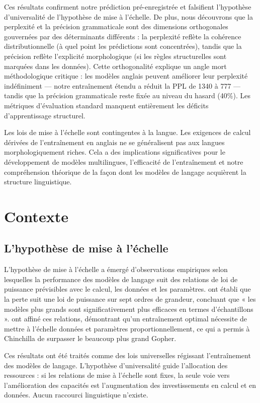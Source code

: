 \documentclass[11pt,a4paper]{article}
\begin{document}
Ces résultats confirment notre prédiction pré-enregistrée et falsifient l'hypothèse d'universalité de l'hypothèse de mise à l'échelle. De plus, nous découvrons que la perplexité et la précision grammaticale sont des dimensions orthogonales gouvernées par des déterminants différents : la perplexité reflète la cohérence distributionnelle (à quel point les prédictions sont concentrées), tandis que la précision reflète l'explicité morphologique (si les règles structurelles sont marquées dans les données). Cette orthogonalité explique un angle mort méthodologique critique : les modèles anglais peuvent améliorer leur perplexité indéfiniment --- notre entraînement étendu a réduit la PPL de 1340 à 777 --- tandis que la précision grammaticale reste fixée au niveau du hasard (40\%). Les métriques d'évaluation standard manquent entièrement les déficits d'apprentissage structurel.

Les lois de mise à l'échelle sont contingentes à la langue. Les exigences de calcul dérivées de l'entraînement en anglais ne se généralisent pas aux langues morphologiquement riches. Cela a des implications significatives pour le développement de modèles multilingues, l'efficacité de l'entraînement et notre compréhension théorique de la façon dont les modèles de langage acquièrent la structure linguistique.

\section{Contexte}

\subsection{L'hypothèse de mise à l'échelle}

L'hypothèse de mise à l'échelle a émergé d'observations empiriques selon lesquelles la performance des modèles de langage suit des relations de loi de puissance prévisibles avec le calcul, les données et les paramètres. \citet{kaplan2020scaling} ont établi que la perte suit une loi de puissance sur sept ordres de grandeur, concluant que « les modèles plus grands sont significativement plus efficaces en termes d'échantillons ». \citet{hoffmann2022training} ont affiné ces relations, démontrant qu'un entraînement optimal nécessite de mettre à l'échelle données et paramètres proportionnellement, ce qui a permis à Chinchilla de surpasser le beaucoup plus grand Gopher.

Ces résultats ont été traités comme des lois universelles régissant l'entraînement des modèles de langage. L'hypothèse d'universalité guide l'allocation des ressources : si les relations de mise à l'échelle sont fixes, la seule voie vers l'amélioration des capacités est l'augmentation des investissements en calcul et en données. Aucun raccourci linguistique n'existe.
\end{document}
